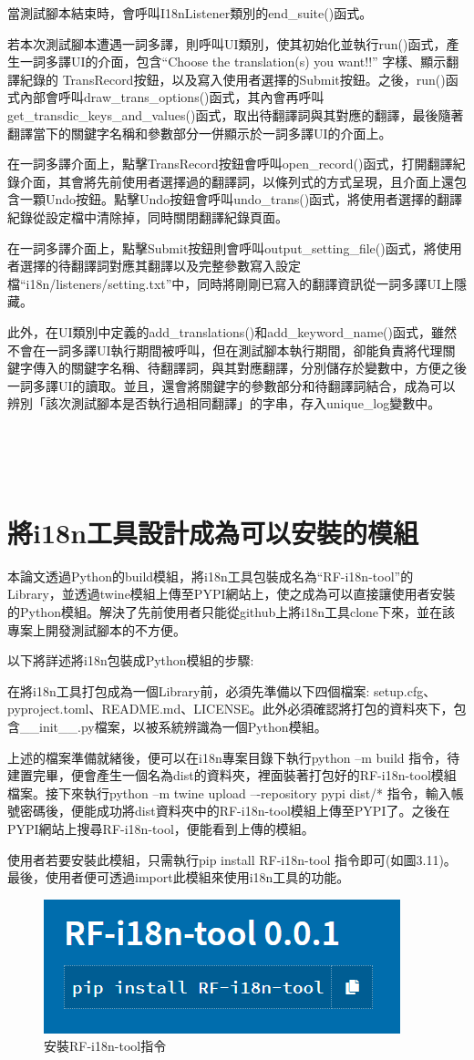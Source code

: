 當測試腳本結束時，會呼叫I18nListener類別的end\_suite()函式。

若本次測試腳本遭遇一詞多譯，則呼叫UI類別，使其初始化並執行run()函式，產生一詞多譯UI的介面，包含“Choose the translation(s) you want!!” 字樣、顯示翻譯紀錄的 TransRecord按鈕，以及寫入使用者選擇的Submit按鈕。之後，run()函式內部會呼叫draw\_trans\_options()函式，其內會再呼叫get\_transdic\_keys\_and\_values()函式，取出待翻譯詞與其對應的翻譯，最後隨著翻譯當下的關鍵字名稱和參數部分一併顯示於一詞多譯UI的介面上。

在一詞多譯介面上，點擊TransRecord按鈕會呼叫open\_record()函式，打開翻譯紀錄介面，其會將先前使用者選擇過的翻譯詞，以條列式的方式呈現，且介面上還包含一顆Undo按鈕。點擊Undo按鈕會呼叫undo\_trans()函式，將使用者選擇的翻譯紀錄從設定檔中清除掉，同時關閉翻譯紀錄頁面。

在一詞多譯介面上，點擊Submit按鈕則會呼叫output\_setting\_file()函式，將使用者選擇的待翻譯詞對應其翻譯以及完整參數寫入設定檔“i18n/listeners/setting.txt”中，同時將剛剛已寫入的翻譯資訊從一詞多譯UI上隱藏。

此外，在UI類別中定義的add\_translations()和add\_keyword\_name()函式，雖然不會在一詞多譯UI執行期間被呼叫，但在測試腳本執行期間，卻能負責將代理關鍵字傳入的關鍵字名稱、待翻譯詞，與其對應翻譯，分別儲存於變數中，方便之後一詞多譯UI的讀取。並且，還會將關鍵字的參數部分和待翻譯詞結合，成為可以辨別「該次測試腳本是否執行過相同翻譯」的字串，存入unique\_log變數中。

\hspace*{\fill} \\
\\ \hspace*{\fill} \\

\section{將i18n工具設計成為可以安裝的模組}
本論文透過Python的build模組，將i18n工具包裝成名為“RF-i18n-tool”的Library，並透過twine模組上傳至PYPI\cite{PYPI}網站上，使之成為可以直接讓使用者安裝的Python模組。解決了先前使用者只能從github上將i18n工具clone下來，並在該專案上開發測試腳本的不方便。

以下將詳述將i18n包裝成Python模組的步驟:

在將i18n工具打包成為一個Library前，必須先準備以下四個檔案: setup.cfg、pyproject.toml、README.md、LICENSE\cite{license}。此外必須確認將打包的資料夾下，包含\_\_init\_\_.py檔案，以被系統辨識為一個Python模組。

上述的檔案準備就緒後，便可以在i18n專案目錄下執行python –m build 指令，待建置完畢，便會產生一個名為dist的資料夾，裡面裝著打包好的RF-i18n-tool模組檔案。接下來執行python –m twine upload –-repository pypi dist/* 指令，輸入帳號密碼後，便能成功將dist資料夾中的RF-i18n-tool模組上傳至PYPI了。之後在PYPI網站上搜尋RF-i18n-tool，便能看到上傳的模組。

使用者若要安裝此模組，只需執行pip install RF-i18n-tool 指令即可(如圖3.11)。最後，使用者便可透過import此模組來使用i18n工具的功能。

\begin{figure}[H]
    \centering
    \includegraphics[width= .5\textwidth]{../論文截圖/3-5-8 安裝RF-AWT-i18n指令.png}
    \caption{安裝RF-i18n-tool指令}
\end{figure}